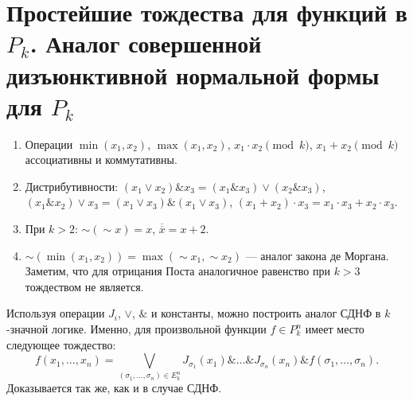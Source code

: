 \section{Простейшие тождества для функций в $P_k$. Аналог совершенной дизъюнктивной нормальной формы для $P_k$}

\begin{enumerate}
    \item Операции $\min(x_1, x_2)$, $\max(x_1, x_2)$, $x_1 \cdot x_2 \pmod k$, $x_1 + x_2 \pmod k$ ассоциативны и коммутативны.
    \item Дистрибутивности: $(x_1 \vee x_2) \& x_3 = (x_1 \& x_3) \vee (x_2 \& x_3)$, $(x_1 \& x_2) \vee x_3 = (x_1 \vee x_3) \& (x_1 \vee x_3)$, $(x_1 + x_2) \cdot x_3 = x_1 \cdot x_3 + x_2 \cdot x_3$.
    \item При $k > 2$: ${\sim}({\sim}x) = x$, $\overline{\overline{x}} = x + 2$.
    \item ${\sim}(\min(x_1, x_2)) = \max({\sim}x_1, {\sim}x_2)$ --- аналог закона де Моргана. Заметим, что для отрицания Поста аналогичное равенство при $k > 3$ тождеством не является.
\end{enumerate}

Используя операции $J_i$, $\vee$, $\&$ и константы, можно построить аналог СДНФ в $k$-значной логике. Именно, для произвольной функции $f \in P_k^n$ имеет место следующее тождество:
\[
    f(x_1, \ldots, x_n) = \bigvee_{(\sigma_1, \ldots, \sigma_n) \in E_k^n}J_{\sigma_1}(x_1) \& \ldots \& J_{\sigma_n}(x_n) \& f(\sigma_1, \ldots, \sigma_n).
\]
Доказывается так же, как и в случае СДНФ.

